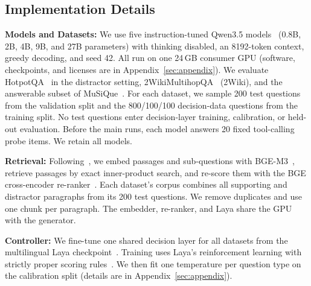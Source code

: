 \subsection{Implementation Details}
\label{sec:method:impl}

\textbf{Models and Datasets:} We use five instruction-tuned Qwen3.5
models~\cite{qwen35} (0.8B, 2B, 4B, 9B, and 27B parameters) with thinking disabled,
an 8192-token context, greedy decoding, and seed 42. All run on one 24\,GB consumer GPU
(software, checkpoints, and licenses are in Appendix~\ref{sec:appendix}). We evaluate
HotpotQA~\cite{yang2018hotpotqa} in the distractor setting,
2WikiMultihopQA~\cite{ho2020twowiki} (2Wiki), and the answerable subset of
MuSiQue~\cite{trivedi2022musique}. For each dataset, we sample 200 test questions from the
validation split and the 800/100/100 decision-data questions from the training split.
No test questions enter decision-layer training, calibration, or held-out evaluation.
Before the main runs, each model answers 20 fixed tool-calling probe items. We retain
all models.

\textbf{Retrieval:} Following~\cite{yang2025enhancing}, we embed passages and
sub-questions with BGE-M3~\cite{chen2024bgem3}, retrieve passages by exact inner-product
search, and re-score them with the BGE cross-encoder re-ranker~\cite{bgerankerv2m3}.
Each dataset's corpus combines all supporting and distractor paragraphs from its 200 test
questions. We remove duplicates and use one chunk per paragraph. The embedder, re-ranker,
and Laya share the GPU with the generator.

\textbf{Controller:} We fine-tune one shared decision layer for all datasets from the
multilingual Laya checkpoint~\cite{laya}. Training uses Laya's reinforcement learning
with strictly proper scoring rules~\cite{laya}. We then fit one temperature per question
type on the calibration split (details are in Appendix~\ref{sec:appendix}).

